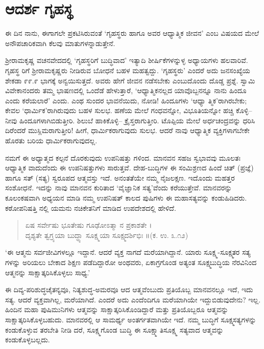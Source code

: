 
\chapter{ಆದರ್ಶ ಗೃಹಸ್ಥ}

ಈ ದಿನ ನಾನು, ಈಗಾಗಲೇ ಪ್ರಕಟಿಸಿರುವಂತೆ ‘ಗೃಹಸ್ಥರು ಹಾಗೂ ಅವರ ಆಧ್ಯಾತ್ಮಿಕ ಜೀವನ’ ಎಂಬ ವಿಷಯದ ಮೇಲೆ ಅನೌಪಚಾರಿಕವಾಗಿ ಕೆಲವು ಮಾತುಗಳನ್ನಾಡುತ್ತೇನೆ.

ಶ್ರೀರಾಮಕೃಷ್ಣ ವಚನವೇದದಲ್ಲಿ ‘ಗೃಹಸ್ಥರಿಗೆ ಬುದ್ಧಿವಾದ’ ಇತ್ಯಾದಿ ಶೀರ್ಷಿಕೆಗಳನ್ನುಳ್ಳ ಅಧ್ಯಾಯಗಳು ಹಲವಾರಿವೆ. ಗೃಹಸ್ಥ ರಿಗೆ ಶ್ರೀರಾಮಕೃಷ್ಣರು ನೀಡಿರುವ ಬೋಧನೆ ಬಹಳ ಮಹತ್ವದ್ದು. ‘ಗೃಹಸ್ಥರು’ ಎಂದರೆ ಅದು ಜನಸಂಖ್ಯೆಯ ಶೇಕಡಾ ೯೯.೯ ಭಾಗಕ್ಕೆ ಅನ್ವಯಿಸುತ್ತದೆ. ಅವರು ಹೇಗೆ ಜೀವನ ನಡೆಸಬೇಕು ಎಂಬುದೊಂದು ದೊಡ್ಡ ಪ್ರಶ್ನೆ. ಸ್ವಾಮಿ ವಿವೇಕಾನಂದರು ತಮ್ಮ ಭಾಷಣದಲ್ಲಿ ಒಂದೆಡೆ ಹೇಳುತ್ತಾರೆ, ‘ಆಧ್ಯಾತ್ಮಿಕನಲ್ಲದ ಯಾವೊಬ್ಬನನ್ನೂ ನಾನು ಹಿಂದೂ ಎಂದು ಕರೆಯಲಾರೆ’ ಎಂದು. ಎಂಥ ಸುಂದರ ಭಾವನೆಯಿದು, ನೋಡಿ! ಹಿಂದೂಗಳು ‘ಆಧ್ಯಾ ತ್ಮಿಕ’ರಾಗಿರಬೇಕು; ಕೇವಲ ‘ಧಾರ್ಮಿಕ’ರಾಗಿರುವುದು ಬಹಳ ಸುಲಭ. ಹಣೆಯ ಮೇಲೆ ಗಂಧವನ್ನೋ, ವಿಭೂತಿಯನ್ನೋ ಹಚ್ಚಿ ಕೊಳ್ಳಿ–ನೀವು ಹಿಂದೂಗಳಾಗಿಬಿಡುತ್ತೀರಿ. ಶಿಲುಬೆ ಹಾಕಿಕೊಳ್ಳಿ– ಕ್ರೈಸ್ತರಾಗುತ್ತೀರಿ. ಟೊಪ್ಪಿಯ ಮೇಲೆ ಅರ್ಧಚಂದ್ರವನ್ನು ಧರಿಸಿ ದಿರೆಂದರೆ ಮುಸ್ಲಿಮರಾಗುತ್ತೀರಿ! ಹೀಗೆ, ಧಾರ್ಮಿಕರಾಗುವುದು ಸುಲಭ. ಆದರೆ ನಾವು ಆಧ್ಯಾತ್ಮಿಕ ವ್ಯಕ್ತಿಗಳಾಗಬೇಕೇ ಹೊರತು ಬರಿಯ ಧಾರ್ಮಿಕರಾಗುವುದಲ್ಲ.

ನಮಗೆ ಈ ಅಧ್ಯಾತ್ಮದ ಕಲ್ಪನೆ ದೊರಕುವುದು ಉಪನಿಷತ್ತು ಗಳಿಂದ. ಮಾನವನ ಸಹಜ ಸ್ವಭಾವವು ಮೂಲತಃ ಆಧ್ಯಾತ್ಮಿಕ ವಾದುದೆಂದು ಈ ಉಪನಿಷತ್ತುಗಳು ಸಾರುತ್ತವೆ. ದೇಹ-ಬುದ್ಧಿಗಳ ಈ ಸಂಮಿಶ್ರಣದ ಹಿಂದೆ ಚಿತ್ (ಪ್ರಜ್ಞೆ) ಹಾಗೂ ಸತ್ (ಸತ್ಯ) ಸ್ವರೂಪದ ಆತ್ಮವಸ್ತು ಇದೆ. ಅನಂತತೆಯೇ ನಮ್ಮ ನೈಜಲಕ್ಷಣ. ಇದೊಂದು ಮಹತ್ತರ ಸಂಶೋಧನೆ. ಇದನ್ನು ನಾವು ಮಾನವನ ಕುರಿತಾದ ‘ವೈಜ್ಞಾನಿಕ ಸತ್ಯ’ವೆಂದು ಕರೆಯುತ್ತೇವೆ. ಮಾನವರನ್ನು ಕೂಲಂಕಷವಾಗಿ ಅಧ್ಯಯನ ಮಾಡಿ ನಮ್ಮ ಉಪನಿಷತ್ ಕಾಲದ ಪುಷಿಗಳು ಈ ಮಹಾಸತ್ಯವನ್ನು ಕಂಡುಹಿಡಿದರು. ಕಠೋಪನಿಷತ್ತಿ ನಲ್ಲಿ ಯಮನು ನಚಿಕೇತನಿಗೆ ಮಾಡಿದ ಉಪದೇಶದಲ್ಲಿ ಹೇಳಿದೆ.

\begin{verse}
ಏಷ ಸರ್ವೇಷು ಭೂತೇಷು ಗೂಢೋಽತ್ಮಾ ನ ಪ್ರಕಾಶತೇ ।\\ ದೃಶ್ಯತೇ ತ್ವಗ್ರ್ಯಯಾ ಬುದ್ಧ್ಯಾ ಸೂಕ್ಷ್ಮಯಾ ಸೂಕ್ಷ್ಮದರ್ಶಿಭಿಃ ॥\hfill (ಕ. ಉ. ೩.೧೨)
\end{verse}

‘ಈ ಆತ್ಮನು ಸರ್ವಜೀವಿಗಳಲ್ಲೂ ಇದ್ದಾನೆ. ಆದರೆ ವ್ಯಕ್ತ ನಾಗದೆ ಮರೆಯಾಗಿದ್ದಾನೆ. ಯಾರು ಸೂಕ್ಷ್ಮ-ಸೂಕ್ಷ್ಮತರ ಸತ್ಯ ಗಳನ್ನು ಅರಿಯಲು ಬೇಕಾದ ಶಿಕ್ಷಣ ಪಡೆದಿದ್ದಾರೋ ಅಂಥವರು, ಏಕಾಗ್ರಗೊಂಡ ಅತ್ಯಂತ ಸೂಕ್ಷ್ಮಬುದ್ಧಿಯ ನೆರವಿನಿಂದ ಆತ್ಮನನ್ನು ಸಾಕ್ಷಾತ್ಕರಿಸಿಕೊಳ್ಳಲು ಸಾಧ್ಯ.’

ಈ ದಿವ್ಯ-ಪರಿಶುದ್ಧಚೈತನ್ಯವೂ, ನಿತ್ಯಶುದ್ಧ-ಅಮರವೂ ಆದ ಆತ್ಮವೆಂಬುದು ಪ್ರತಿಯೊಬ್ಬ ಮಾನವನಲ್ಲೂ ಇದೆ, ಇದು ಸತ್ಯ. ಆದರೆ ವ್ಯಕ್ತವಾಗಿಲ್ಲ, ಮರೆಯಾಗಿದೆ. ಎಂದರೆ ಅದು ಎಂದೆಂದಿಗೂ ಮರೆಯಾಗಿಯೇ ಇದ್ದುಬಿಡುವುದೇನು? ಇಲ್ಲ. ಹಿಂದಿನ ಮಹಾ ಪುಷಿಮುನಿಗಳು ಆತ್ಮವನ್ನು ಸಾಕ್ಷಾತ್ಕರಿಸಿಕೊಂಡಿದ್ದಾರೆ ಮತ್ತು ಪ್ರತಿಯೊಬ್ಬರೂ ಆತ್ಮವನ್ನು ಸಾಕ್ಷಾತ್ಕರಿಸಿಕೊಳ್ಳಬಹುದು. ಮಾನವರಲ್ಲಿ ಆ ಸಾಮರ್ಥ್ಯ ಅಂತರ್ಗತವಾಗಿಯೇ ಇದೆ. ನಮ್ಮ ಬುದ್ಧಿಗೆ ಸೂಕ್ಷ್ಮಸತ್ಯಗಳನ್ನು ಕಂಡುಕೊಳ್ಳುವ ತರಬೇತಿ ನೀಡಿ ದರೆ, ಸೂಕ್ಷ್ಮಗೊಂಡ ಬುದ್ಧಿ ಈ ಸೂಕ್ಷ್ಮಾತಿಸೂಕ್ಷ್ಮ ಸತ್ಯವಾದ ಆತ್ಮವನ್ನು ಕಂಡುಕೊಳ್ಳಬಲ್ಲದು.

